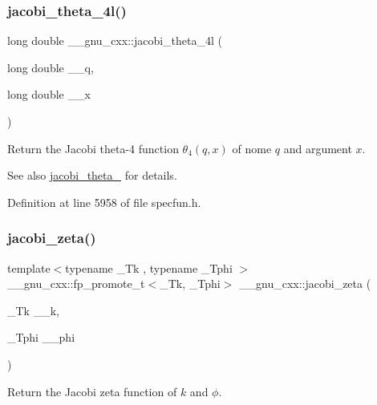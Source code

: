 \subsubsection{\texorpdfstring{jacobi\+\_\+theta\+\_\+4l()}{jacobi\_theta\_4l()}}
{\footnotesize\ttfamily long double \+\_\+\+\_\+gnu\+\_\+cxx\+::jacobi\+\_\+theta\+\_\+4l (\begin{DoxyParamCaption}\item[{long double}]{\+\_\+\+\_\+q,  }\item[{long double}]{\+\_\+\+\_\+x }\end{DoxyParamCaption})\hspace{0.3cm}{\ttfamily [inline]}}

Return the Jacobi theta-\/4 function $ \theta_4(q,x) $ of nome $ q $ and argument $ x $.

\begin{DoxySeeAlso}{See also}
\hyperlink{group__gnu__math__spec__func_ga676501b6284d5702a3dc61252e6c78ab}{jacobi\+\_\+theta\+\_} for details. 
\end{DoxySeeAlso}


Definition at line 5958 of file specfun.\+h.

\mbox{\label{group__gnu__math__spec__func_ga639be4ebef9a20572375ec534be52b07}} 
\subsubsection{\texorpdfstring{jacobi\+\_\+zeta()}{jacobi\_zeta()}}
{\footnotesize\ttfamily template$<$typename \+\_\+\+Tk , typename \+\_\+\+Tphi $>$ \\
\+\_\+\+\_\+gnu\+\_\+cxx\+::fp\+\_\+promote\+\_\+t$<$\+\_\+\+Tk, \+\_\+\+Tphi$>$ \+\_\+\+\_\+gnu\+\_\+cxx\+::jacobi\+\_\+zeta (\begin{DoxyParamCaption}\item[{\+\_\+\+Tk}]{\+\_\+\+\_\+k,  }\item[{\+\_\+\+Tphi}]{\+\_\+\+\_\+phi }\end{DoxyParamCaption})\hspace{0.3cm}{\ttfamily [inline]}}

Return the Jacobi zeta function of $ k $ and $ \phi $.

